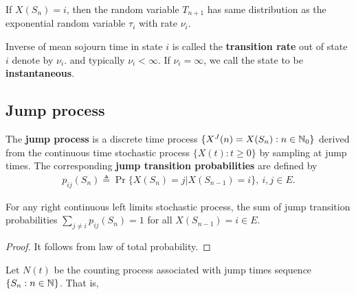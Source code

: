 \documentclass[a4paper,10pt,english]{article}
\begin{document}
\begin{cor}
If $X(S_{n}) = i$, then the random variable $T_{n+1}$ has same distribution as the exponential random variable $\tau_{i}$ with rate $\nu_i$. 
\end{cor}
Inverse of mean sojourn time in state $i$ is called the \textbf{transition rate} out of state $i$ denote by $\nu_i$. and typically $\nu_i < \infty$.  
If $\nu_i = \infty$, we call the state to be \textbf{instantaneous}. 

\subsection{Jump process}
The \textbf{jump process} is a discrete time process $\{X^J(n) = X(S_n): n \in \mathbb{N}_0\}$ derived from 
the continuous time stochastic process $\{X(t): t \geqslant 0\}$ by sampling at jump times.  
The corresponding \textbf{jump transition probabilities} %
are defined by
\begin{align*}
p_{ij}(S_n) \triangleq %
\Pr\{X(S_n)  = j | X(S_{n-1}) =  i \}, ~i,j \in E.
\end{align*}
\begin{lem}
For any right continuous left limits stochastic process, the sum of jump transition probabilities $\sum_{j \neq i}p_{ij}(S_n) = 1$ for all $X(S_{n-1}) = i \in E$. 
\end{lem}
\begin{proof}
It follows from law of total probability. 
\end{proof}
Let $N(t)$ be the counting process associated with jump times sequence $\{S_n: n \in \mathbb{N}\}$. 
That is, 
\end{document}
